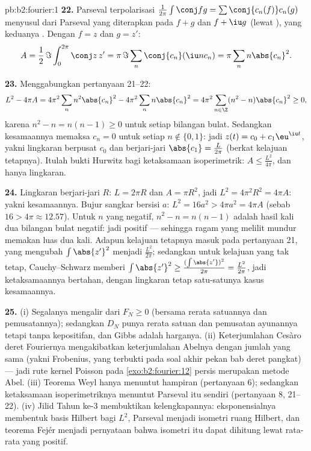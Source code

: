 \begin{solution}{pb:b2:fourier:1}
\textbf{22.} Parseval terpolarisasi $\frac{1}{2\pi}\int\conj
fg = \sum\conj{c_n(f)}c_n(g)$ menyusul dari Parseval yang diterapkan pada
$f + g$ dan $f + \iu g$ (lewat ), yang keduanya
. Dengan $f = z$ dan $g = z'$:
\[
A = \frac12\,\Im\int_0^{2\pi}\conj z\,z'
= \pi\,\Im\sum_n\conj{c_n}(\iu n c_n)
= \pi\sum_n n\abs{c_n}^2 .
\]

\textbf{23.} Menggabungkan pertanyaan 21--22:
\[
L^2 - 4\pi A
= 4\pi^2\sum_n n^2\abs{c_n}^2 -
4\pi^2\sum_n n\abs{c_n}^2
= 4\pi^2\sum_{n\in\Z}(n^2 - n)\abs{c_n}^2 \geq 0 ,
\]
karena $n^2 - n = n(n-1) \geq 0$ untuk setiap bilangan bulat. Sedangkan kesamaannya
memaksa $c_n = 0$ untuk setiap $n \notin \{0, 1\}$: jadi $z(t) = c_0 +
c_1\eu^{\iu t}$, yakni lingkaran berpusat $c_0$ dan berjari-jari
$\abs{c_1} = \frac{L}{2\pi}$ (berkat kelajuan tetapnya). Itulah bukti Hurwitz
bagi ketaksamaan isoperimetrik: $A \leq \frac{L^2}{4\pi}$,
dan hanya lingkaran.

\textbf{24.} Lingkaran berjari-jari $R$: $L = 2\pi R$ dan $A = \pi
R^2$, jadi $L^2 = 4\pi^2R^2 = 4\pi A$: yakni kesamaannya. Bujur sangkar bersisi
$a$: $L^2 = 16a^2 > 4\pi a^2 = 4\pi A$ (sebab $16 > 4\pi \approx
12.57$). Untuk $n$ yang negatif, $n^2 - n = n(n - 1)$ adalah hasil kali
dua bilangan bulat negatif: jadi positif --- sehingga ragam yang melilit mundur
memakan luas dua kali. Adapun kelajuan tetapnya masuk pada pertanyaan 21,
yang mengubah $\int\abs{z'}^2$ menjadi $\frac{L^2}{2\pi}$; sedangkan untuk
kelajuan yang tak tetap, Cauchy--Schwarz memberi $\int\abs{z'}^2 \geq
\frac{(\int\abs{z'})^2}{2\pi} = \frac{L^2}{2\pi}$, jadi
ketaksamaannya bertahan, dengan lingkaran tetap satu-satunya kasus
kesamaannya.

\textbf{25.} (i) Segalanya mengalir dari $F_N \geq 0$ (bersama rerata
satuannya dan pemusatannya); sedangkan $D_N$ punya rerata satuan dan pemusatan
ayunannya tetapi tanpa kepositifan, dan Gibbs adalah harganya.
(ii) Keterjumlahan Cesàro deret Fouriernya mengakibatkan
keterjumlahan Abelnya dengan jumlah yang sama (yakni Frobenius, yang terbukti pada
soal akhir pekan bab deret pangkat) --- jadi rute kernel Poisson
pada \cref{exo:b2:fourier:12} persis merupakan metode Abel.
(iii) Teorema Weyl hanya menuntut hampiran 
(pertanyaan 6); sedangkan ketaksamaan isoperimetriknya menuntut Parseval
itu sendiri (pertanyaan 8, 21--22). (iv) Jilid Tahun ke-3 membuktikan
kelengkapannya: eksponensialnya membentuk basis Hilbert bagi $L^2$,
Parseval menjadi isometri ruang Hilbert, dan teorema Fejér
menjadi pernyataan bahwa isometri itu dapat dihitung
lewat rata-rata yang positif.

\end{solution}
